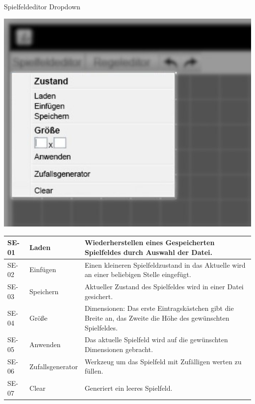 \documentclass[11pt,a4paper]{article}
\begin{document}
	
\pagebreak
\par
    Spielfeldeditor Dropdown %
    \par
    \includegraphics[width=15cm]{spielfeldeditor_dropdown_edit.jpeg} %

    \begin{longtable}[m]{|m{2cm}|m{4cm}|m{9cm}|} %
        \hline
        SE-01 & Laden & Wiederherstellen eines Gespeicherten Spielfeldes durch Auswahl der Datei. \\
        \hline
        SE-02 & Einfügen & Einen kleineren Spielfeldzustand in das Aktuelle wird an einer beliebigen Stelle eingefügt. \\
        \hline
        SE-03 & Speichern & Aktueller Zustand des Spielfeldes wird in einer Datei gesichert. \\
        \hline
        SE-04 & Größe & Dimensionen: Das erste Eintragskästchen gibt die Breite an, das Zweite die Höhe des gewünschten Spielfeldes.\\
        \hline
        SE-05 & Anwenden & Das aktuelle Spielfeld wird auf die gewünschten Dimensionen gebracht. \\
        \hline
        SE-06 & Zufallsgenerator & Werkzeug um das Spielfeld mit Zufälligen werten zu füllen.\\
        \hline
        SE-07 & Clear & Generiert ein leeres Spielfeld.\\
        \hline
    \end{longtable}
    
\end{document}
